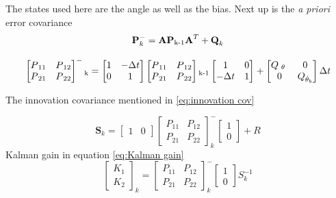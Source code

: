\documentclass[a4paper,11pt]{kth-mag}
\begin{document}
The states used here  are the angle as well as the bias. Next up is the \textit{a priori} error covariance
\begin{equation}
\textbf{P}^-_k = \textbf{A} \textbf{P}\textsubscript{k-1}\textbf{A}^T + \textbf{Q}_k
\end{equation}

\begin{equation}
\begin{bmatrix}
P\textsubscript{11} & P\textsubscript{12} \\
P\textsubscript{21} & P\textsubscript{22}
\end{bmatrix}^-\textsubscript{k} =
\begin{bmatrix}
1  & -\Delta t \\
0   & 1
\end{bmatrix}
\begin{bmatrix}
P\textsubscript{11} & P\textsubscript{12} \\
P\textsubscript{21} & P\textsubscript{22}
\end{bmatrix}\textsubscript{k-1}
\begin{bmatrix}
1 & 0 \\
-\Delta t & 1
\end{bmatrix}
+
\begin{bmatrix}
Q\textsubscript{ $\theta$ } & 0 \\
0 & Q\textsubscript{$\dot{\theta}_b$}
\end{bmatrix}
\Delta t
\end{equation}

The innovation covariance mentioned in \ref{eq:innovation cov}

\begin{equation} 
\textbf{S}_k=
\begin{bmatrix}
1 & 0
\end{bmatrix}
\begin{bmatrix}
P_{11} & P_{12} \\
P_{21} & P_{22} 
\end{bmatrix}^- _k
\begin{bmatrix}
1 \\ 0
\end{bmatrix}
+
R
\end{equation}
Kalman gain in equation \ref{eq:Kalman gain}
\begin{equation}
\begin{bmatrix}
K_1 \\ K_2
\end{bmatrix}_k
=
\begin{bmatrix}
P_{11} & P_{12} \\
P_{21} & P_{22}
\end{bmatrix}^-_k
\begin{bmatrix}
1 \\ 0
\end{bmatrix}
S^{-1}_k
\end{equation}
\end{document}
